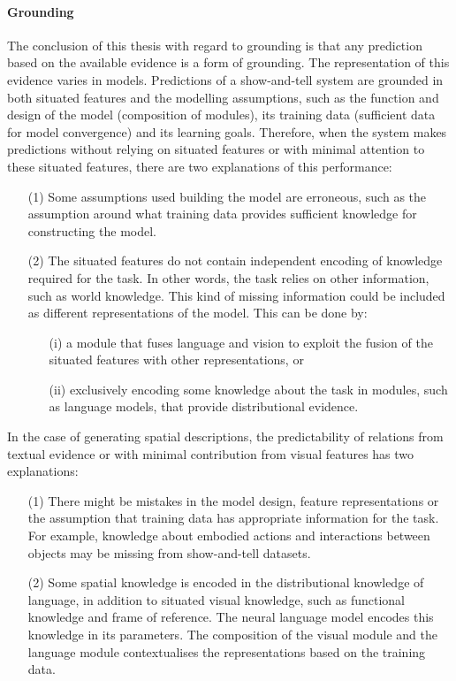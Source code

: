 \paragraph{Grounding}
The conclusion of this thesis with regard to grounding is that any prediction based on the available evidence is a form of grounding. 
The representation of this evidence varies in models. 
Predictions of a show-and-tell system are grounded in both situated features and the 
modelling assumptions, such as the function and design of the model (composition of modules), its training data %
(sufficient data for model convergence) 
and its learning goals.
Therefore, when %
the system makes 
predictions without relying on situated features or with minimal attention to these situated features, there are two explanations of this performance:
\begin{itemize}
	\item[(1)] Some assumptions used building the model are erroneous, such as the assumption around what training data provides sufficient knowledge for constructing the model.
	\item[(2)] The situated features do not contain independent encoding of knowledge required for the task. In other words, the task relies on other information, such as world knowledge. This kind of missing information could be included as different representations of the model. This can be done by:
	\begin{itemize}
	\item[(i)] a module
	that fuses
	language and vision
	to exploit the fusion of
	the situated features with other representations, or 
	\item[(ii)] exclusively encoding some knowledge about the task in modules, such as language models, that provide distributional evidence. 
	\end{itemize}
\end{itemize}

In the case of generating spatial descriptions, the predictability of relations from textual evidence or with minimal contribution from visual features has two explanations:
\begin{itemize}    
	\item[(1)] There might be mistakes in the model design, feature representations or the assumption that training data has appropriate information for the task. 
	For example, knowledge about embodied actions and interactions between objects may be missing from show-and-tell datasets.
	\item[(2)] Some spatial knowledge is encoded in the distributional knowledge of language, in addition to situated visual knowledge, such as functional knowledge and frame of reference. 
	The neural language model encodes this knowledge in its parameters. 
	The composition of the visual module and the language module contextualises the representations based on the training data. %
\end{itemize}

